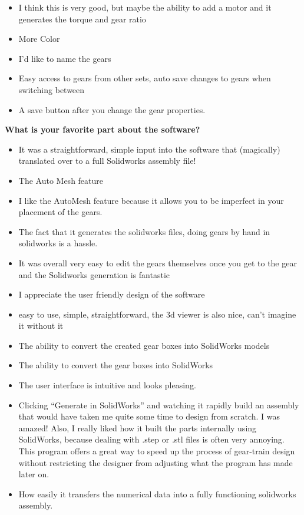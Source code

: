 \begin{itemize}
    \item I think this is very good, but maybe the ability to add a motor and it generates the torque and gear ratio
    \item More Color
    \item I'd like to name the gears
    \item Easy access to gears from other sets, auto save changes to gears when switching between
    \item A save button after you change the gear properties. 
\end{itemize}

\noindent\textbf{What is your favorite part about the software?}
\begin{itemize}
    \item It was a straightforward, simple input into the software that (magically) translated over to a full Solidworks assembly file!
    \item The Auto Mesh feature
    \item I like the AutoMesh feature because it allows you to be imperfect in your placement of the gears.
    \item The fact that it generates the solidworks files, doing gears by hand in solidworks is a hassle.
    \item It was overall very easy to edit the gears themselves once you get to the gear and the Solidworks generation is fantastic
    \item I appreciate the user friendly design of the software
    \item easy to use, simple, straightforward, the 3d viewer is also nice, can't imagine it without it
    \item The ability to convert the created gear boxes into SolidWorks models
    \item The ability to convert the gear boxes into SolidWorks
    \item The user interface is intuitive and looks pleasing.
    \item Clicking ``Generate in SolidWorks'' and watching it rapidly build an assembly that would have taken me quite some time to design from scratch. I was amazed! Also, I really liked how it built the parts internally using SolidWorks, because dealing with .step or .stl files is often very annoying. This program offers a great way to speed up the process of gear-train design without restricting the designer from adjusting what the program has made later on.
    \item How easily it transfers the numerical data into a fully functioning solidworks assembly.

\end{itemize}

